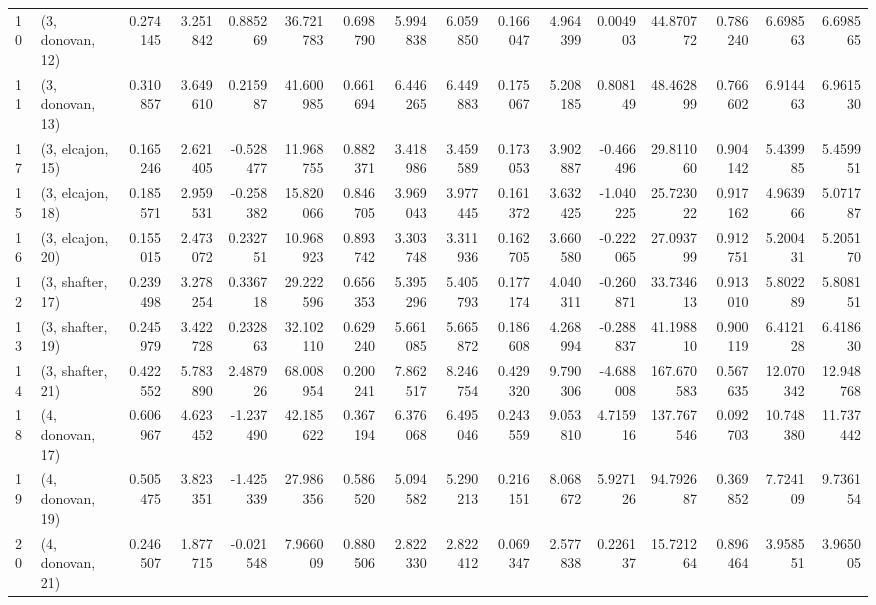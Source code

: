 \begin{tabular}{llrrrrrrrrrrrrrr}
10 &  (3, donovan, 12) &   0.274145 &  3.251842 &  0.885269 &  36.721783 &  0.698790 &   5.994838 &  6.059850 &  0.166047 &   4.964399 &  0.004903 &   44.870772 &  0.786240 &   6.698563 &   6.698565 \\
11 &  (3, donovan, 13) &   0.310857 &  3.649610 &  0.215987 &  41.600985 &  0.661694 &   6.446265 &  6.449883 &  0.175067 &   5.208185 &  0.808149 &   48.462899 &  0.766602 &   6.914463 &   6.961530 \\
17 &  (3, elcajon, 15) &   0.165246 &  2.621405 & -0.528477 &  11.968755 &  0.882371 &   3.418986 &  3.459589 &  0.173053 &   3.902887 & -0.466496 &   29.811060 &  0.904142 &   5.439985 &   5.459951 \\
15 &  (3, elcajon, 18) &   0.185571 &  2.959531 & -0.258382 &  15.820066 &  0.846705 &   3.969043 &  3.977445 &  0.161372 &   3.632425 & -1.040225 &   25.723022 &  0.917162 &   4.963966 &   5.071787 \\
16 &  (3, elcajon, 20) &   0.155015 &  2.473072 &  0.232751 &  10.968923 &  0.893742 &   3.303748 &  3.311936 &  0.162705 &   3.660580 & -0.222065 &   27.093799 &  0.912751 &   5.200431 &   5.205170 \\
12 &  (3, shafter, 17) &   0.239498 &  3.278254 &  0.336718 &  29.222596 &  0.656353 &   5.395296 &  5.405793 &  0.177174 &   4.040311 & -0.260871 &   33.734613 &  0.913010 &   5.802289 &   5.808151 \\
13 &  (3, shafter, 19) &   0.245979 &  3.422728 &  0.232863 &  32.102110 &  0.629240 &   5.661085 &  5.665872 &  0.186608 &   4.268994 & -0.288837 &   41.198810 &  0.900119 &   6.412128 &   6.418630 \\
14 &  (3, shafter, 21) &   0.422552 &  5.783890 &  2.487926 &  68.008954 &  0.200241 &   7.862517 &  8.246754 &  0.429320 &   9.790306 & -4.688008 &  167.670583 &  0.567635 &  12.070342 &  12.948768 \\
18 &  (4, donovan, 17) &   0.606967 &  4.623452 & -1.237490 &  42.185622 &  0.367194 &   6.376068 &  6.495046 &  0.243559 &   9.053810 &  4.715916 &  137.767546 &  0.092703 &  10.748380 &  11.737442 \\
19 &  (4, donovan, 19) &   0.505475 &  3.823351 & -1.425339 &  27.986356 &  0.586520 &   5.094582 &  5.290213 &  0.216151 &   8.068672 &  5.927126 &   94.792687 &  0.369852 &   7.724109 &   9.736154 \\
20 &  (4, donovan, 21) &   0.246507 &  1.877715 & -0.021548 &   7.966009 &  0.880506 &   2.822330 &  2.822412 &  0.069347 &   2.577838 &  0.226137 &   15.721264 &  0.896464 &   3.958551 &   3.965005 \\

\end{tabular}
